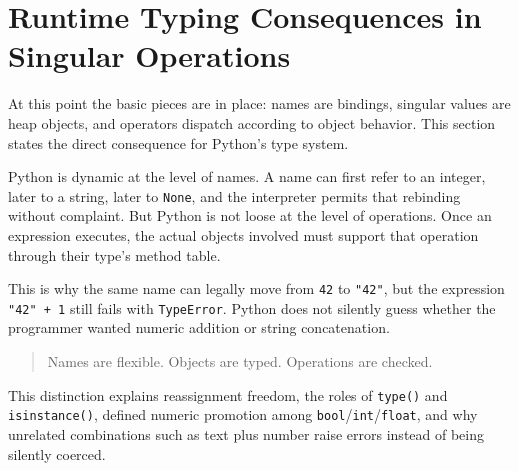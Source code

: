 \section{Runtime Typing Consequences in Singular Operations}

At this point the basic pieces are in place: names are bindings, singular values are heap objects, and operators dispatch according to object behavior. This section states the direct consequence for Python's type system.

Python is dynamic at the level of names. A name can first refer to an integer, later to a string, later to \texttt{None}, and the interpreter permits that rebinding without complaint. But Python is not loose at the level of operations. Once an expression executes, the actual objects involved must support that operation through their type's method table.

This is why the same name can legally move from \texttt{42} to \texttt{"42"}, but the expression \texttt{"42" + 1} still fails with \texttt{TypeError}. Python does not silently guess whether the programmer wanted numeric addition or string concatenation.

\begin{quote}
Names are flexible. Objects are typed. Operations are checked.
\end{quote}

This distinction explains reassignment freedom, the roles of \texttt{type()} and \texttt{isinstance()}, defined numeric promotion among \texttt{bool}/\texttt{int}/\texttt{float}, and why unrelated combinations such as text plus number raise errors instead of being silently coerced.
